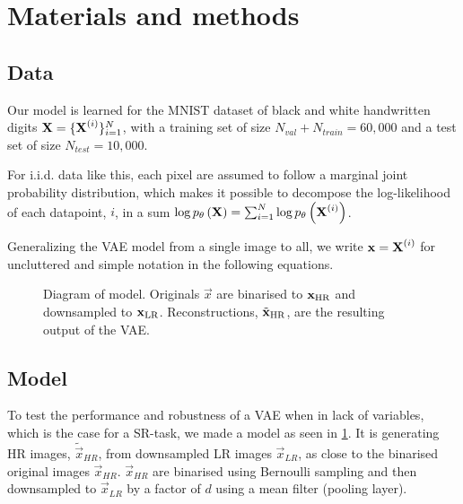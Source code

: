 \section{Materials and methods}
\label{sec:method}

\subsection{Data}
\label{sub:data}
Our model is learned for the MNIST dataset \cite{MNIST} of black and white handwritten digits $\bm{\mathrm{X}} = \{\bm{\mathrm{X}}^{(i)}\}^N_{i=1}$, with a training set of size $N_{val} + N_{train} = 60,000$ and a test set of size $N_{test}=10,000$.  

For i.i.d. data like this, each pixel are assumed to follow a marginal joint probability distribution, which makes it possible to decompose the log-likelihood of each datapoint, $i$, in a sum $\log p_{\theta}\left(\bm{\mathrm{X}}\right) = \sum^N_{i=1} \log p_{\theta}\left(\bm{\mathrm{X}}^{(i)}\right)$. 


Generalizing the VAE model from a single image to all, we write $\bm{\mathrm{x}} = \bm{\mathrm{X}}^{(i)}$ for uncluttered and simple notation in the following equations.

\begin{figure*}
	\centering
	
	\caption{Diagram of model. Originals $\vec{x}$ are binarised to $\bm{\mathrm{x}}_{\text{HR}}$ and downsampled to $\bm{\mathrm{x}}_{\text{LR}}$. Reconstructions, $\tilde{\bm{\mathrm{x}}}_{\text{HR}}$, are the resulting output of the VAE.}
	\label{fig:diagram}
\end{figure*}


\subsection{Model}
\label{sub:the_model}

To test the performance and robustness of a VAE when in lack of variables, which is the case for a SR-task, we made a model as seen in \ref{fig:diagram}. It is generating HR images, $\tilde{\vec{x}}_{HR}$, from downsampled LR images $\vec{x}_{LR}$, as close to the binarised original images $\vec{x}_{HR}$. $\vec{x}_{HR}$ are binarised using Bernoulli sampling and then downsampled to $\vec{x}_{LR}$ by a factor of $d$ using a mean filter (pooling layer).

